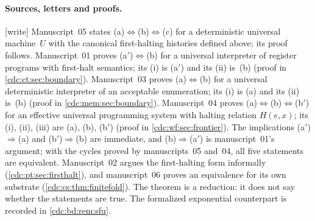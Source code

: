\documentclass[11pt,a4paper]{article}
\theoremstyle{definition}
\theoremstyle{remark}
\newcommand{\wtag}{\textup{[write]}}%
\begin{document}
\paragraph{Sources, letters and proofs.} \wtag{} Manuscript~05 states (a)$\Leftrightarrow$(b)$\Leftrightarrow$(c) for a deterministic universal machine~$U$ with the canonical first-halting histories defined above; its proof follows. Manuscript~01 proves (a$'$)$\Leftrightarrow$(b) for a universal interpreter of register programs with first-halt semantics; its (i) is (a$'$) and its (ii) is~(b) (proof in \cref{cdc:ct:sec:boundary}). Manuscript~03 proves (a)$\Leftrightarrow$(b) for a universal deterministic interpreter of an acceptable enumeration; its (i) is (a) and its (ii) is~(b) (proof in \cref{cdc:mem:sec:boundary}). Manuscript~04 proves (a)$\Leftrightarrow$(b)$\Leftrightarrow$(b$'$) for an effective universal programming system with halting relation $H(e,x)$; its (i), (ii), (iii) are (a), (b), (b$'$) (proof in \cref{cdc:wf:sec:frontier}). The implications (a$'$)$\Rightarrow$(a) and (b$'$)$\Rightarrow$(b) are immediate, and (b)$\Rightarrow$(a$'$) is manuscript~01's argument; with the cycles proved by manuscripts~05 and~04, all five statements are equivalent. Manuscript~02 argues the first-halting form informally (\cref{cdc:pt:sec:firsthalt}), and manuscript~06 proves an equivalence for its own substrate (\cref{cdc:cs:thm:finitefold}). The theorem is a reduction: it does not say whether the statements are true. The formalized exponential counterpart is recorded in \cref{cdc:bd:rem:sfu}.
\end{document}
